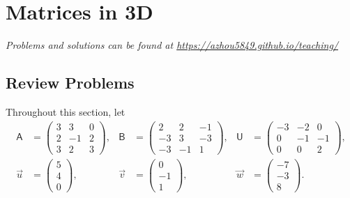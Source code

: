 \section{Matrices in 3D}

\emph{Problems and solutions can be found at \url{https://azhou5849.github.io/teaching/}}

\subsection{Review Problems}

Throughout this section, let
\begin{align*}
\mathsf{A} &= \begin{pmatrix} 3 & 3 & 0 \\ 2 & -1 & 2 \\ 3 & 2 & 3 \end{pmatrix}, & \mathsf{B} &= \begin{pmatrix} 2 & 2 & -1 \\ -3 & 3 & -3 \\ -3 & -1 & 1 \end{pmatrix}, & \mathsf{U} &= \begin{pmatrix} -3 & -2 & 0 \\ 0 & -1 & -1 \\ 0 & 0 & 2 \end{pmatrix}, \\
\vec{u} &= \begin{pmatrix} 5 \\ 4 \\ 0 \end{pmatrix}, & \vec{v} &= \begin{pmatrix} 0 \\ -1 \\ 1 \end{pmatrix}, & \vec{w} &= \begin{pmatrix} -7 \\ -3 \\ 8 \end{pmatrix}.
\end{align*}

